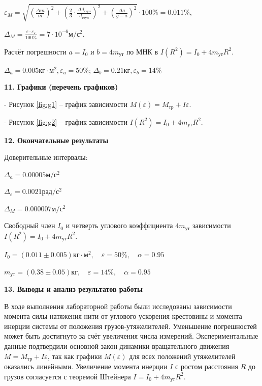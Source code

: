 \documentclass[14pt]{extreport}
\begin{document}
\centerline{$\varepsilon_M = \sqrt{(\frac{\Delta m}{m})^2 + (\frac{2}{3} \cdot \frac{\Delta d_\text{ступ}}{d_\text{ступ}})^2 + (\frac{\Delta a}{g-a})^2} \cdot 100\% = 0.011\%$,}

\centerline{$\Delta_M=\frac{\varepsilon \cdot \varepsilon_\varepsilon}{100\%} = 7 \cdot 10^{-6} \text{м}/\text{с}^2$.}

Расчёт погрешности $a = I_0$ и $b = 4m_\text{ут}$ по МНК в $I(R^2) = I_0 + 4 m_\text{ут} R^2$.

\centerline{$\Delta_a=0.005 \text{кг}\cdot\text{м}^2, \varepsilon_a=50\%$; $\Delta_b=0.21 \text{кг}, \varepsilon_b=14\%$}

\noindent\textbf{11. Графики (перечень графиков)}

- Рисунок \ref{fig:g1} -- график зависимости $M(\varepsilon) = M_\text{тр}+I\varepsilon$.

- Рисунок \ref{fig:g2} -- график зависимости $I(R^2) = I_0+4m_\text{ут}R^2$.

\noindent\textbf{12. Окончательные результаты}

Доверительные интервалы:

\centerline{$\Delta_a = 0.00005 \text{м}/\text{с}^2$}

\centerline{$\Delta_\varepsilon= 0.0021 \text{рад}/\text{с}^2$}

\centerline{$\Delta_M = 0.000007 \text{м}/\text{с}^2$}

Свободный член $I_0$ и четверть углового коэффициента $4m_\text{ут}$ зависимости $I(R^2) = I_0+4m_\text{ут}R^2$.

\centerline{$I_0 = (0.011 \pm 0.005) \text{кг} \cdot \text{м}^2, \quad \varepsilon = 50 \%, \quad \alpha = 0.95$}

\centerline{$m_\text{ут} = (0.38 \pm 0.05) \text{кг}, \quad \varepsilon = 14 \%, \quad \alpha = 0.95$}

\noindent\textbf{13. Выводы и анализ результатов работы}

В ходе выполнения лабораторной работы были исследованы зависимости момента силы натяжения нити от углового ускорения крестовины и момента инерции системы от положения грузов-утяжелителей. Уменьшение погрешностей может быть достигнуто за счёт увеличения числа измерений. Экспериментальные данные подтвердили основной закон динамики вращательного движения $M = M_\text{тр} + I \varepsilon$, так как графики $M(\varepsilon)$ для всех положений утяжелителей оказались линейными. Увеличение момента инерции $I$ с ростом расстояния $R$ до грузов согласуется с теоремой Штейнера $I = I_0 + 4 m_\text{ут} R^2$. 
\end{document}
